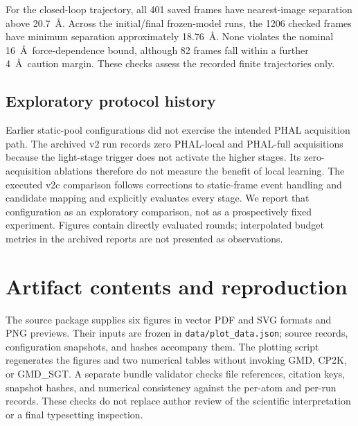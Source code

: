 For the closed-loop trajectory, all 401 saved frames have nearest-image
separation above 20.7~\AA. Across the initial/final frozen-model runs,
the 1206 checked frames have minimum separation approximately
18.76~\AA. None violates the nominal 16~\AA\ force-dependence bound,
although 82 frames fall within a further 4~\AA\ caution margin.
These checks assess the recorded finite trajectories only.

\subsection{Exploratory protocol history}
Earlier static-pool configurations did not exercise the intended
PHAL acquisition path. The archived v2 run records zero PHAL-local
and PHAL-full acquisitions because the light-stage trigger does not
activate the higher stages. Its zero-acquisition ablations therefore
do not measure the benefit of local learning. The executed v2c
comparison follows corrections to static-frame event handling and
candidate mapping and explicitly evaluates every stage. We report
that configuration as an exploratory comparison, not as a
prospectively fixed experiment. Figures contain directly evaluated
rounds; interpolated budget metrics in the archived reports are not
presented as observations.

\section{Artifact contents and reproduction}
The source package supplies six figures in vector PDF and SVG formats
and PNG previews. Their inputs are frozen in
\texttt{data/plot\_data.json}; source records, configuration snapshots,
and hashes accompany them. The plotting script regenerates the figures
and two numerical tables without invoking GMD, CP2K, or GMD\_SGT.
A separate bundle validator checks file references, citation keys,
snapshot hashes, and numerical consistency against the per-atom
and per-run records. These checks do not replace author review of
the scientific interpretation or a final typesetting inspection.
